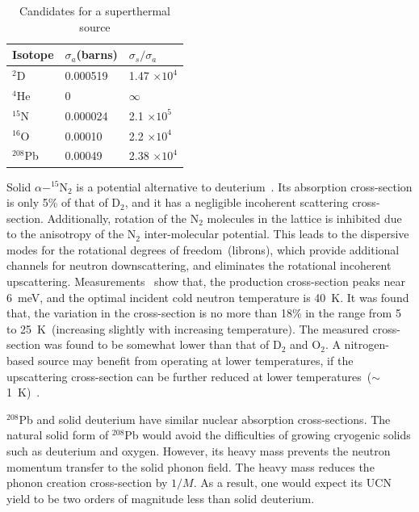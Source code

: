 \begin{table}
\begin{center}
\begin{tabular}{|l|l|l|}
\hline
Isotope & $\sigma_a$(barns) & $\sigma_s / \sigma_a$  \\
\hline
$^2$D & 0.000519 & 1.47 $\times 10^4$ \\
\hline
$^4$He & 0 & $\infty$ \\
\hline
$^{15}$N & 0.000024 & 2.1 $\times 10^5$ \\
\hline
$^{16}$O & 0.00010 & 2.2 $\times 10^4$ \\
\hline
$^{208}$Pb & 0.00049 &  2.38 $\times 10^4$\\
\hline
\end{tabular}
\end{center}
\caption{Candidates for a superthermal source\label{tab:other_sources}}
\end{table}

Solid $\alpha - ^{15}$N$_2$ is a potential alternative to
deuterium~\cite{Salvat2013}. Its absorption cross-section is only 5\%
of that of D$_2$, and it has a negligible incoherent scattering
cross-section. Additionally, rotation of the N$_2$ molecules in the
lattice is inhibited due to the anisotropy of the N$_2$
inter-molecular potential. This leads to the dispersive modes for the
rotational degrees of freedom~(librons), which provide additional
channels for neutron downscattering, and eliminates the rotational
incoherent upscattering. Measurements~\cite{Salvat2013} show that, the
production cross-section peaks near 6~meV, and the optimal incident
cold neutron temperature is 40~K. It was found that, the variation in
the cross-section is no more than 18\% in the range from 5 to
25~K~(increasing slightly with increasing temperature). The measured
cross-section was found to be somewhat lower than that of D$_2$ and
O$_2$.
A nitrogen-based source may benefit from operating at lower
temperatures, if the upscattering cross-section can be further reduced
at lower temperatures~($\sim$1~K)~\cite{Salvat2013}.


$^{208}$Pb and solid deuterium have similar nuclear absorption
cross-sections. The natural solid form of $^{208}$Pb would avoid the
difficulties of growing cryogenic solids such as deuterium and
oxygen. However, its heavy mass prevents the neutron momentum transfer
to the solid phonon field. The heavy mass reduces the phonon creation
cross-section by $1/M$. As a result, one would expect its UCN yield to
be two orders of magnitude less than solid deuterium.

